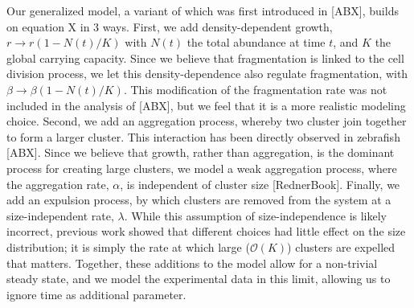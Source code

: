 \documentclass[aps,pre,twocolumn]{revtex4-1}
\begin{document}
Our generalized model, a variant of which was first introduced in [ABX], builds on equation X in 3 ways. First, we add density-dependent growth, $r\to r(1-N(t)/K)$ with $N(t)$ the total abundance at time $t$, and $K$ the global carrying capacity. Since we believe that fragmentation is linked to the cell division process, we let this density-dependence also regulate fragmentation, with $\beta\to \beta(1-N(t)/K)$. This modification of the fragmentation rate was not included in the analysis of [ABX], but we feel that it is a more realistic modeling choice. Second, we add an aggregation process, whereby two cluster join together to form a larger cluster. This interaction has been directly observed in zebrafish [ABX]. Since we believe that growth, rather than aggregation, is the dominant process for creating large clusters, we model a weak aggregation process, where the aggregation rate, $\alpha$, is independent of cluster size [RednerBook]. Finally, we add an expulsion process, by which clusters are removed from the system at a size-independent rate, $\lambda$. While this assumption of size-independence is likely incorrect, previous work showed that different choices had little effect on the size distribution; it is simply the rate at which large ($\mathcal{O}(K)$) clusters are expelled that matters. Together, these additions to the model allow for a non-trivial steady state, and we model the experimental data in this limit, allowing us to ignore time as additional parameter.
\end{document}
